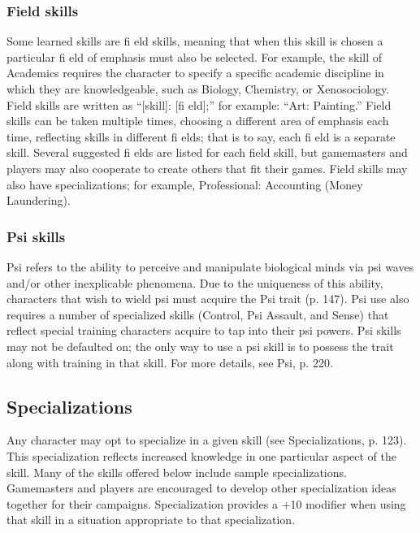 \subsubsection{Field skills}
\label{sec:skills:field-skills}

Some learned skills are fi eld skills, meaning that when this skill is chosen a particular fi eld of emphasis must also be selected. For example, the skill of Academics requires the character to specify a specific academic discipline in which they are knowledgeable, such as Biology, Chemistry, or Xenosociology. Field skills are written as “[skill]: [fi eld];” for example: “Art: Painting.” Field skills can be taken multiple times, choosing a different area of emphasis each time, reflecting skills in different fi elds; that is to say, each fi eld is a separate skill. Several suggested fi elds are listed for each field
skill, but gamemasters and players may also cooperate to create others that fit their games. Field skills may also have specializations; for example, Professional: Accounting (Money Laundering).


\subsubsection{Psi skills}
\label{sec:skills:psi-skills}

Psi refers to the ability to perceive and manipulate biological minds via psi waves and/or other inexplicable phenomena. Due to the uniqueness of this ability, characters that wish to wield psi must acquire the Psi trait (p. 147). Psi use also requires a number of specialized skills (Control, Psi Assault, and Sense) that reflect special training characters acquire to tap into their psi powers. Psi skills may not be defaulted on; the only way to use a psi skill is to possess the trait
along with training in that skill. For more details, see Psi, p. 220.


\subsection{Specializations}
\label{sec:skills:specializations}
Any character may opt to specialize in a given skill (see Specializations, p. 123). This specialization reflects increased knowledge in one particular aspect of the skill. Many of the skills offered below include sample specializations. Gamemasters and players are encouraged to develop other specialization ideas together for their campaigns. Specialization provides a +10 modifier when using that skill in a situation appropriate to that specialization.


